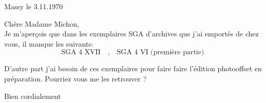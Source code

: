 \begin{flushright}
Massy le 3.11.1970\\
\end{flushright}
Chère Madame Michon,\\

Je m'aperçois que dans les exemplaires SGA d'archives que j'ai emportés de chez vous, il manque les suivants:
\[
\text{SGA 4 XVII}\quad,\quad\text{SGA 4 VI (première partie)}
\]

D'autre part j'ai besoin de ces exemplaires pour faire faire l'édition photooffset en préparation. Pourriez vous me les retrouver ?

Bien cordialement\\

